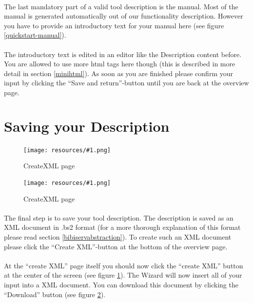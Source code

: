 \documentclass[a4paper,10pt]{book}
\newcommand{\bigpic}[1]{\texttt{[image: resources/\#1.png]}}
\begin{document}
\paragraph{} The last mandatory part of a valid tool description is the manual. Most of the manual is generated automatically out of our functionality description. However you have to provide an introductory text for your manual here (see figure \ref{quickstart-manual}).
\paragraph{} The introductory text is edited in an editor like the Description content before. You are allowed to use more html tags here though (this is described in more detail in section \ref{minihtml}). As soon as you are finished please confirm your input by clicking the ``Save and return''-button until you are back at the overview page.

\section{Saving your Description}

\begin{figure}
 \bigpic{quickstart-createXML1}
\caption{CreateXML page}
\label{quickstart-createXML1}
\end{figure}

\begin{figure}
 \bigpic{quickstart-createXML2}
\caption{CreateXML page}
\label{quickstart-createXML2}
\end{figure}

\paragraph{} The final step is to save your tool description. The description is saved as an XML document in .bs2 format (for a more thorough explanation of this format please read section \ref{bibiservabstraction}). To create such an XML document please click the ``Create XML''-button at the bottom of the overview page.
\paragraph{} At the ``create XML'' page itself you should now click the ``create XML'' button at the center of the screen (see figure \ref{quickstart-createXML1}). The Wizard will now insert all of your input into a XML document. You can download this document by clicking the ``Download'' button (see figure \ref{quickstart-createXML2}).
\end{document}

